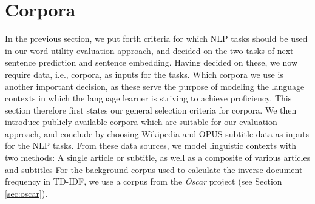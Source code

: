 %
%
%
%
%



\section{Corpora}
In the previous section, we put forth criteria for which NLP tasks should be used in our word utility evaluation approach, and decided on the two tasks of next sentence prediction and sentence embedding.
Having decided on these, we now require data, i.e., corpora, as inputs for the tasks.
Which corpora we use is another important decision, as these serve the purpose of modeling the language contexts in which the language learner is striving to achieve proficiency.
This section therefore first states our general selection criteria for corpora.
We then introduce publicly available corpora which are suitable for our evaluation approach, and conclude by choosing Wikipedia and OPUS subtitle data as inputs for the NLP tasks.
From these data sources, we model linguistic contexts with two methods:
A single article or subtitle, as well as a composite of various articles and subtitles
For the background corpus used to calculate the inverse document frequency in TD-IDF, we use a corpus from the \textit{Oscar} project (see Section \ref{sec:oscar}).


